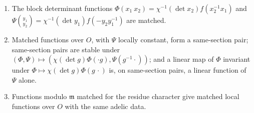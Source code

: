 \begin{proposition}\label{prop:matched}
\begin{enumerate}[label=\textup{(\alph*)}]
\item The block determinant functions $\Phi(x_1\ x_2)=\chi^{-1}(\det x_2)f(x_2^{-1}x_1)$ and $\Psi\binom{y_1}{y_2}=\chi^{-1}(\det y_1)f(-y_2y_1^{-1})$ are matched.
\item Matched functions over $O$, with $\Psi$ locally constant, form a same-section pair; same-section pairs are stable under $(\Phi,\Psi)\mapsto(\chi(\det g)\Phi(\cdot g),\Psi(g^{-1}\cdot))$; and a linear map of
$\Phi$ invariant under $\Phi\mapsto\chi(\det g)\Phi(g\,\cdot)$ is, on same-section pairs, a linear function of $\Psi$ alone.
\item Functions modulo $\mathfrak m$ matched for the residue character give matched local functions over $O$ with the same adelic data.
\end{enumerate}
\end{proposition}

